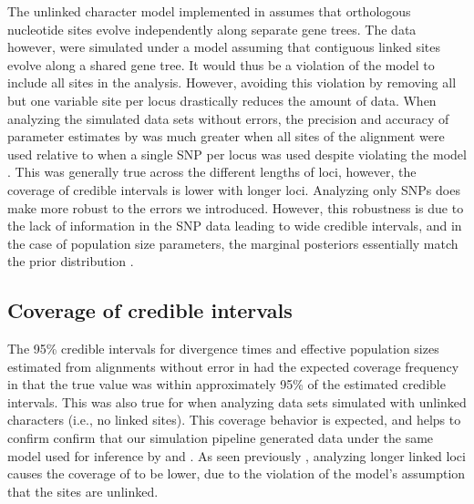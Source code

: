 The unlinked character model implemented in \ecoevolity assumes that orthologous 
nucleotide sites evolve independently along separate gene trees. The data however, were
simulated under a model assuming that contiguous linked sites evolve along a shared 
gene tree. It would thus be a violation of the \ecoevolity model to include all
sites in the analysis.
However, avoiding this violation by removing all but one variable site per
locus drastically reduces the amount of data.
When analyzing the simulated data sets without errors, the precision and accuracy of
parameter estimates by \ecoevolity was much greater
when all sites of the alignment were used relative to when a single SNP per 
locus was used despite violating the model \mainfigsp.
This was generally true across the different lengths of loci, however, the
coverage of credible intervals is lower with longer loci.
Analyzing only SNPs does make \ecoevolity more robust to the errors
we introduced.
However, this robustness is due to the lack of information in the
SNP data leading to wide credible intervals, and in the case of
population size parameters, the marginal posteriors essentially
match the prior distribution \thetafigsp.





\subsection{Coverage of credible intervals}
The 95\% credible intervals for divergence times and effective population sizes
estimated from alignments without error in \beast had the expected coverage
frequency in that the true value was within approximately 95\% of the estimated
credible intervals. 
This was also true for \ecoevolity when analyzing data sets simulated with
unlinked characters (i.e., no linked sites).
This coverage behavior is expected, and helps to confirm confirm that our
simulation pipeline generated data under the same model used for inference by
\beast and \ecoevolity. 
As seen previously \parencite{oaks2019}, analyzing longer linked loci
causes the coverage of \ecoevolity to be lower, due to the violation of the
model's assumption that the sites are unlinked.

